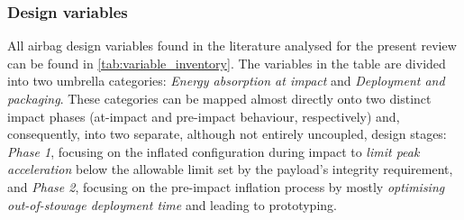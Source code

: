 \subsubsection{Design variables}
All airbag design variables found in the literature analysed for the present review can be found in \cref{tab:variable_inventory}. The variables in the table are divided into two umbrella categories: \textit{Energy absorption at impact} and \textit{Deployment and packaging}. These categories can be mapped almost directly onto two distinct impact phases (at-impact and pre-impact behaviour, respectively) and, consequently, into two separate, although not entirely uncoupled, design stages: \textit{Phase 1}, focusing on the inflated configuration during impact to \textit{limit peak acceleration} below the allowable limit set by the payload's integrity requirement, and \textit{Phase 2}, focusing on the pre-impact inflation process by mostly \textit{optimising out-of-stowage deployment time} and leading to prototyping.

